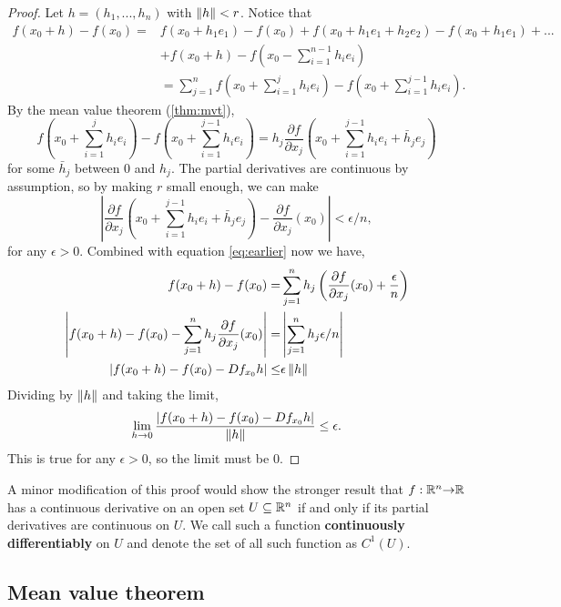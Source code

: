 \begin{proof}
  Let $h = (h_1, ..., h_n)$ with $\left\Vert {h} \right\Vert<r$. Notice that
  \begin{align} 
    f(x_0+h) - f(x_0) = & f(x_0 + h_1 e_1) - f(x_0) + f(x_0+h_1 e_1 +
    h_2 e_2) - f(x_0 + h_1 e_1) + ... \\
    & + f(x_0 + h) - f\left(x_0 -
    \sum_{i=1}^{n-1} h_i e_i\right) \\
    &  = \sum_{j=1}^n f\left(x_0 + \sum_{i=1}^j h_i e_i\right) -
    f\left(x_0 + \sum_{i=1}^{j-1} h_i e_i\right). \label{eq:earlier}
  \end{align}
  By the mean value theorem (\ref{thm:mvt}), 
  \[ f\left(x_0 + \sum_{i=1}^j h_i e_i\right) -
  f\left(x_0 + \sum_{i=1}^{j-1} h_i e_i\right) = h_j \frac{\partial f}
  {\partial x_j} (x_0 +  \sum_{i=1}^{j-1} h_i e_i + \bar{h}_je_j) \]
  for some $\bar{h}_j$ between $0$ and $h_j$.  The partial derivatives
  are continuous by assumption, so by making $r$ small enough, we can
  make  
  \[\left| \frac{\partial f}
    {\partial x_j} (x_0 +  \sum_{i=1}^{j-1} h_i e_i + \bar{h}_je_j) -
    \frac{\partial f}{\partial x_j}(x_0) \right| < \epsilon /n, \]
  for any $\epsilon>0$. 
  Combined with equation \ref{eq:earlier} now we have,
  \begin{align} 
    f(x_0+h) - f(x_0) = & \sum_{j=1}^n  h_j \left(\frac{\partial f}{\partial
        x_j} (x_0) + \frac{\epsilon}{n}\right) \\
    \left| f(x_0+h) - f(x_0)  - \sum_{j=1}^n  h_j \frac{\partial f}{\partial
        x_j} (x_0) \right| = & \left| \sum_{j=1}^n h_j \epsilon/n \right|
    \\
    \left| f(x_0+h) - f(x_0)  - Df_{x_0} h \right| \leq & \epsilon
    \left\Vert {h} \right\Vert 
  \end{align}
  Dividing by $\left\Vert {h} \right\Vert$ and taking the limit, 
  \[ \lim_{h {\rightarrow} 0} \frac{\left| f(x_0+h) - f(x_0)  - Df_{x_0} h
    \right|}{\left\Vert {h} \right\Vert} \leq \epsilon.
  \]
  This is true for any $\epsilon>0$, so the limit must be 0. 
\end{proof}
A minor modification of this proof would show the stronger result that
$f:\mathbb{R}^n {\rightarrow} \mathbb{R}$ has a continuous derivative on an open set $U
\subseteq \mathbb{R}^n$ if and only if its partial derivatives are continuous
on $U$. We call such a function \textbf{continuously differentiably}
on $U$ and denote the set of all such function as $C^1(U)$. 

\subsection{Mean value theorem}

